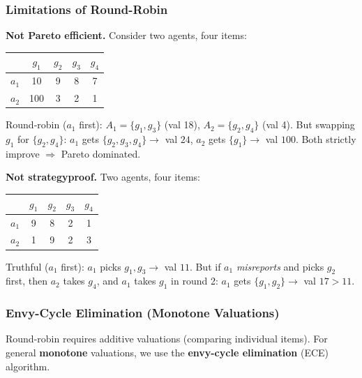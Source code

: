 \separator

\subsubsection{Limitations of Round-Robin}

\textbf{Not Pareto efficient.} Consider two agents, four items:

\begin{center}
\begin{tabular}{lcccc}
\toprule
       & $g_1$ & $g_2$ & $g_3$ & $g_4$ \\
\midrule
$a_1$  & 10    & 9     & 8     & 7 \\
$a_2$  & 100   & 3     & 2     & 1 \\
\bottomrule
\end{tabular}
\end{center}

Round-robin ($a_1$ first): $A_1 = \{g_1, g_3\}$ (val 18), $A_2 = \{g_2, g_4\}$ (val 4). But swapping $g_1$ for $\{g_2, g_4\}$: $a_1$ gets $\{g_2, g_3, g_4\} \to$ val $24$, $a_2$ gets $\{g_1\} \to$ val $100$. Both strictly improve $\Rightarrow$ Pareto dominated.

\textbf{Not strategyproof.} Two agents, four items:

\begin{center}
\begin{tabular}{lcccc}
\toprule
       & $g_1$ & $g_2$ & $g_3$ & $g_4$ \\
\midrule
$a_1$  & 9     & 8     & 2     & 1 \\
$a_2$  & 1     & 9     & 2     & 3 \\
\bottomrule
\end{tabular}
\end{center}

Truthful ($a_1$ first): $a_1$ picks $g_1, g_3 \to$ val $11$. But if $a_1$ \emph{misreports} and picks $g_2$ first, then $a_2$ takes $g_4$, and $a_1$ takes $g_1$ in round 2: $a_1$ gets $\{g_1, g_2\} \to$ val $17 > 11$.

\separator

\subsubsection{Envy-Cycle Elimination (Monotone Valuations)}

Round-robin requires additive valuations (comparing individual items). For general \textbf{monotone} valuations, we use the \textbf{envy-cycle elimination} (ECE) algorithm.

